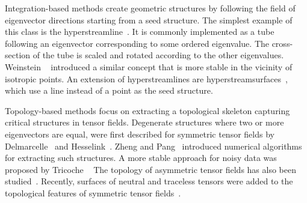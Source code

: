 %
Integration-based methods create geometric structures by following the field of
eigenvector directions starting from a seed structure.
%
The simplest example of this class is the hyperstreamline~\cite{Delmarcelle1993}.
%
It is commonly implemented as a tube following an eigenvector corresponding
to some ordered eigenvalue.
%
The cross-section of the tube is scaled and rotated according to the other
eigenvalues.
%
Weinstein \etal~\cite{Weinstein1999} introduced a similar concept that is more
stable in the vicinity of isotropic points.
%
An extension of hyperstreamlines are hyperstreamsurfaces~\cite{Jeremic2002},
which use a line instead of a point as the seed structure.
%

%
Topology-based methods focus on extracting a topological skeleton capturing
critical structures in tensor fields.
%
Degenerate structures where two or more eigenvectors are equal, were first
described for symmetric tensor fields by Delmarcelle~\cite{Delmarcelle1994} and
Hesselink~\cite{Hesselink1997}.
%
Zheng and Pang~\cite{Zheng2004,Zheng2005} introduced numerical algorithms for
extracting such structures.
%
A more stable approach for noisy data was proposed by Tricoche
\etal~\cite{Tricoche2008}
%
The topology of asymmetric tensor fields has also been
studied~\cite{Zheng2005a,Zhang2009}.
%
Recently, surfaces of neutral and traceless tensors were added to the
topological features of symmetric tensor fields~\cite{Palacios2016}.
%

%

